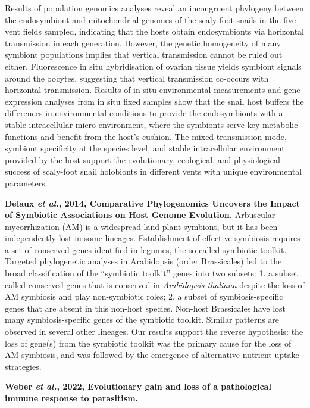 \documentclass[11pt]{article}
\begin{document}
\begin{sloppypar}
Results of population genomics analyses reveal an incongruent phylogeny between the endosymbiont and mitochondrial genomes of the scaly-foot snails in the five vent fields sampled, indicating that the hosts obtain endosymbionts via horizontal transmission in each generation. 
However, the genetic homogeneity of many symbiont populations implies that vertical transmission cannot be ruled out either. 
Fluorescence in situ hybridisation of ovarian tissue yields symbiont signals around the oocytes, suggesting that vertical transmission co-occurs with horizontal transmission. 
Results of in situ environmental measurements and gene expression analyses from in situ fixed samples show that the snail host buffers the differences in environmental conditions to provide the endosymbionts with a stable intracellular micro-environment, where the symbionts serve key metabolic functions and benefit from the host's cushion. 
The mixed transmission mode, symbiont specificity at the species level, and stable intracellular environment provided by the host support the evolutionary, ecological, and physiological success of scaly-foot snail holobionts in different vents with unique environmental parameters.
\par
\textbf{Delaux \textit{et al.}, 2014, Comparative Phylogenomics Uncovers the Impact of Symbiotic Associations on Host Genome Evolution.} \newline
Arbuscular mycorrhization (AM) is a widespread land plant symbiont, but it has been independently lost in some lineages. 
Establishment of effective symbiosis requires a set of conserved genes identified in legumes, the so called symbiotic toolkit. 
Targeted phylogenetic analyses in Arabidopsis (order Brassicales) led to the broad classification of the “symbiotic toolkit” genes into two subsets: 
1. a subset called conserved genes that is conserved in \textit{Arabidopsis thaliana} despite the loss of AM symbiosis and play non-symbiotic roles; 
2. a subset of symbiosis-specific genes that are absent in this non-host species. 
Non-host Brassicales have lost many symbiosis-specific genes of the symbiotic toolkit. 
Similar patterns are observed in several other lineages. 
Our results support the reverse hypothesis: the loss of gene(s) from the symbiotic toolkit was the primary cause for the loss of AM symbiosis, and was followed by the emergence of alternative nutrient uptake strategies. 
\par
\textbf{Weber \textit{et al.}, 2022, Evolutionary gain and loss of a pathological immune response to parasitism.}


  
\end{sloppypar}
\end{document}
